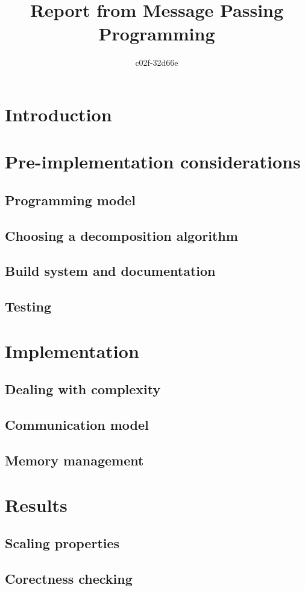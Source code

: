 \documentclass[11pt,a4paper]{article}
\begin{document}
\title{Report from Message Passing Programming}
\author{c02f-32d66e}
\maketitle

\section{Introduction}

\section{Pre-implementation considerations}
\subsection{Programming model}
\subsection{Choosing a decomposition algorithm}
\subsection{Build system and documentation}
\subsection{Testing}

\section{Implementation}
\subsection{Dealing with complexity}
\subsection{Communication model}
\subsection{Memory management}

\section{Results}
\subsection{Scaling properties}
\subsection{Corectness checking}
\end{document}
